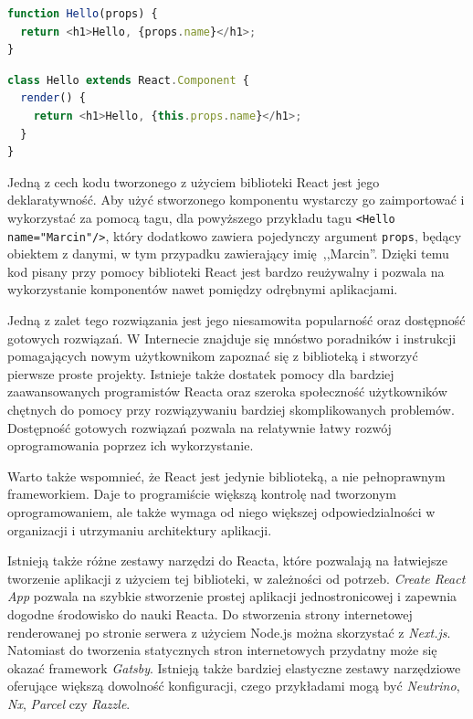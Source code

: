 \documentclass[twoside,a4paper]{report}
\begin{document}
\begin{lstlisting}[caption={Funkcyjny komponent},label={lst:func_comp},language=JavaScript]
function Hello(props) {
  return <h1>Hello, {props.name}</h1>;
}
\end{lstlisting}
\begin{lstlisting}[caption={Klasowy komponent},label={lst:class_comp},language=JavaScript]
class Hello extends React.Component {
  render() {
    return <h1>Hello, {this.props.name}</h1>;
  }
}
\end{lstlisting}

Jedną z cech kodu tworzonego z użyciem biblioteki React jest jego deklaratywność.
Aby użyć stworzonego komponentu wystarczy go zaimportować i wykorzystać za pomocą tagu, dla powyższego przykładu tagu \texttt{<Hello name="Marcin"/>}, który dodatkowo zawiera pojedynczy argument \texttt{props}, będący obiektem z danymi, w tym przypadku zawierający imię~,,Marcin''.
Dzięki temu kod pisany przy pomocy biblioteki React jest bardzo reużywalny i pozwala na wykorzystanie komponentów nawet pomiędzy odrębnymi aplikacjami.

Jedną z zalet tego rozwiązania jest jego niesamowita popularność oraz dostępność gotowych rozwiązań.
W Internecie znajduje się mnóstwo poradników i instrukcji pomagających nowym użytkownikom zapoznać się z biblioteką i stworzyć pierwsze proste projekty.
Istnieje także dostatek pomocy dla bardziej zaawansowanych programistów Reacta oraz szeroka społeczność użytkowników chętnych do pomocy przy rozwiązywaniu bardziej skomplikowanych problemów.
Dostępność gotowych rozwiązań pozwala na relatywnie łatwy rozwój oprogramowania poprzez ich wykorzystanie.

Warto także wspomnieć, że React jest jedynie biblioteką, a nie pełnoprawnym frameworkiem.
Daje to programiście większą kontrolę nad tworzonym oprogramowaniem, ale także wymaga od niego większej odpowiedzialności w organizacji i utrzymaniu architektury aplikacji.

Istnieją także różne zestawy narzędzi do Reacta, które pozwalają na łatwiejsze tworzenie aplikacji z użyciem tej biblioteki, w zależności od potrzeb.
\textit{Create React App} pozwala na szybkie stworzenie prostej aplikacji jednostronicowej i zapewnia dogodne środowisko do nauki Reacta.
Do stworzenia strony internetowej renderowanej po stronie serwera z użyciem Node.js można skorzystać z \textit{Next.js}.
Natomiast do tworzenia statycznych stron internetowych przydatny może się okazać framework \textit{Gatsby}.
Istnieją także bardziej elastyczne zestawy narzędziowe oferujące większą dowolność konfiguracji, czego przykładami mogą być \textit{Neutrino}, \textit{Nx}, \textit{Parcel} czy \textit{Razzle}.
\end{document}
